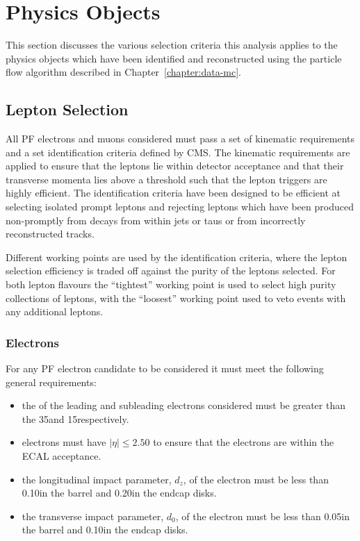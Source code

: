 \section{Physics Objects}\label{sec:eventSelection}
This section discusses the various selection criteria this analysis applies to the physics objects which have been identified and reconstructed using the particle flow algorithm described in Chapter~\ref{chapter:data-mc}.

\subsection{Lepton Selection}
All PF electrons and muons considered must pass a set of kinematic requirements and a set identification criteria defined by CMS.
The kinematic requirements are applied to ensure that the leptons lie within detector acceptance and that their transverse momenta lies above a threshold such that the lepton triggers are highly efficient.
The identification criteria have been designed to be efficient at selecting isolated prompt leptons and rejecting leptons which have been produced non-promptly from decays from within jets or taus or from incorrectly reconstructed tracks.

Different working points are used by the identification criteria, where the lepton selection efficiency is traded off against the purity of the leptons selected.
For both lepton flavours the ``tightest'' working point is used to select high purity collections of leptons, with the ``loosest'' working point used to veto events with any additional leptons.

\subsubsection{Electrons}\label{subsubsec:electronSelection}
For any PF electron candidate to be considered it must meet the following general requirements:

\begin{itemize}
\item the \pt of the leading and subleading electrons considered must be greater than the 35\GeVc and 15\GeVc respectively.
\item electrons must have $|\eta| \leq 2.50$ to ensure that the electrons are within the ECAL acceptance.
\item the longitudinal impact parameter, $d_{z}$, of the electron must be less than 0.10\cm in the barrel and 0.20\cm in the endcap disks.
\item the transverse impact parameter, $d_{0}$, of the electron must be less than 0.05\cm in the barrel and 0.10\cm in the endcap disks.
\end{itemize}


